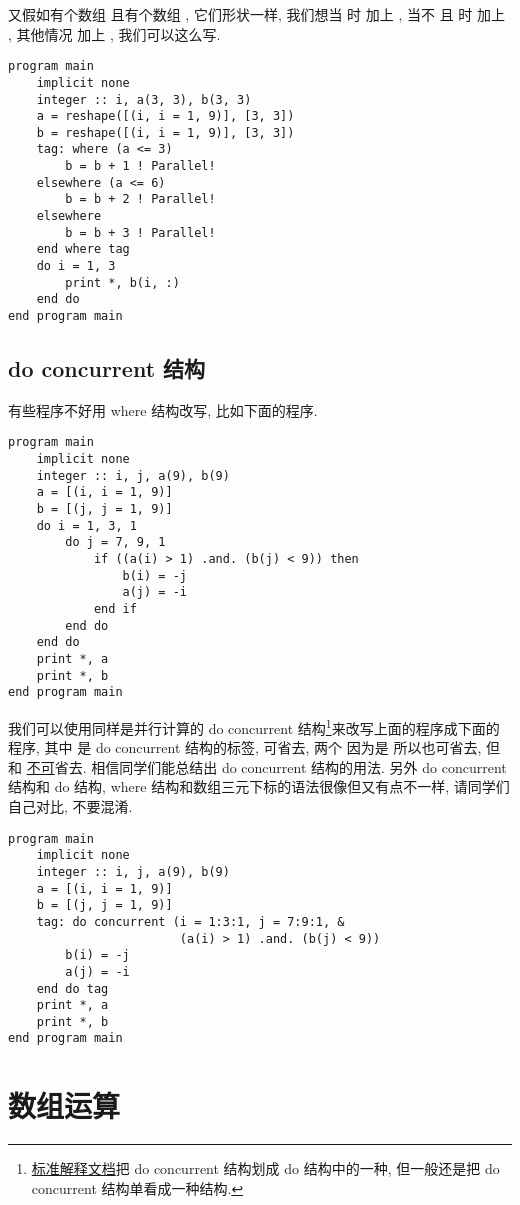 又假如有个数组  且有个数组 , 它们形状一样, 我们想当  时  加上 , 当不  且  时  加上 , 其他情况  加上 , 我们可以这么写.
\begin{lstlisting}
program main
    implicit none
    integer :: i, a(3, 3), b(3, 3)
    a = reshape([(i, i = 1, 9)], [3, 3])
    b = reshape([(i, i = 1, 9)], [3, 3])
    tag: where (a <= 3)
        b = b + 1 ! Parallel!
    elsewhere (a <= 6)
        b = b + 2 ! Parallel!
    elsewhere
        b = b + 3 ! Parallel!
    end where tag
    do i = 1, 3
        print *, b(i, :)
    end do
end program main
\end{lstlisting}

\subsection{do concurrent 结构}

有些程序不好用 where 结构改写, 比如下面的程序.
\begin{lstlisting}
program main
    implicit none
    integer :: i, j, a(9), b(9)
    a = [(i, i = 1, 9)]
    b = [(j, j = 1, 9)]
    do i = 1, 3, 1
        do j = 7, 9, 1
            if ((a(i) > 1) .and. (b(j) < 9)) then
                b(i) = -j
                a(j) = -i
            end if
        end do
    end do
    print *, a
    print *, b
end program main
\end{lstlisting}
我们可以使用同样是并行计算的 do concurrent 结构\footnote{\href{https://j3-fortran.org/doc/year/24/24-007.pdf}{标准解释文档}把 do concurrent 结构划成 do 结构中的一种, 但一般还是把 do concurrent 结构单看成一种结构.}来改写上面的程序成下面的程序, 其中  是 do concurrent 结构的标签, 可省去, 两个  因为是  所以也可省去, 但  和  \uline{不可}省去. 相信同学们能总结出 do concurrent 结构的用法. 另外 do concurrent 结构和 do 结构, where 结构和数组三元下标的语法很像但又有点不一样, 请同学们自己对比, 不要混淆.
\begin{lstlisting}
program main
    implicit none
    integer :: i, j, a(9), b(9)
    a = [(i, i = 1, 9)]
    b = [(j, j = 1, 9)]
    tag: do concurrent (i = 1:3:1, j = 7:9:1, &
                        (a(i) > 1) .and. (b(j) < 9))
        b(i) = -j
        a(j) = -i
    end do tag
    print *, a
    print *, b
end program main
\end{lstlisting}

\section{数组运算}\label{fortran_array_operation}

